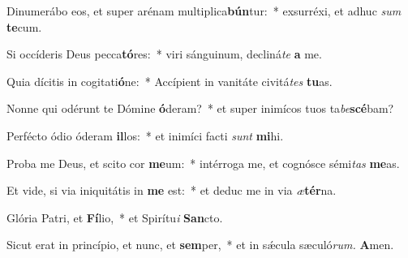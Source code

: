 \item Dinumerábo eos, et super arénam multiplica\textbf{bún}tur:~* exsurréxi, et adhuc \textit{sum} \textbf{te}cum.
\item Si occíderis Deus pecca\textbf{tó}res:~* viri sánguinum, decliná\hspace*{0.03em}\textit{te} \textbf{a} me.
\item Quia dícitis in cogitati\textbf{ó}ne:~* Accípient in vanitáte civitá\hspace*{0.03em}\textit{tes} \textbf{tu}as.
\item Nonne qui odérunt te Dómine \textbf{ó}deram?~* et super inimícos tuos ta\textit{be}\textbf{scé}bam?
\item Perfécto ódio óderam \textbf{il}los:~* et inimíci facti \textit{sunt} \textbf{mi}hi.
\item Proba me Deus, et scito cor \textbf{me}um:~* intérroga me, et cognósce sémi\hspace*{0.03em}\textit{tas} \textbf{me}as.
\item Et vide, si via iniquitátis in \textbf{me} est:~* et deduc me in via \textit{æ}\textbf{tér}na.
\item Glória Patri, et \textbf{Fí}lio,~* et Spirítu\textit{i} \textbf{San}cto.
\item Sicut erat in princípio, et nunc, et \textbf{sem}per,~* et in sǽcula sæculó\textit{rum.} \textbf{A}men.
